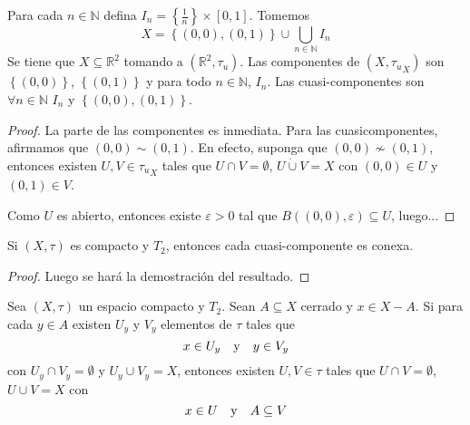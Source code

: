 \documentclass[12pt]{report}
\theoremstyle{largebreak}
\begin{document}
    \begin{exa}
        Para cada $n\in\mathbb{N}$ defina $I_n=\left\{\frac{1}{n}\right\}\times[0,1]$. Tomemos
        \begin{equation*}
            X=\left\{(0,0),(0,1) \right\}\cup\bigcup_{ n\in\mathbb{N}}I_n
        \end{equation*}
        Se tiene que $X\subseteq\mathbb{R}^2$ tomando a $(\mathbb{R}^2,\tau_u)$. Las componentes de $(X,{\tau_u}_X)$ son $\left\{(0,0)\right\}$, $\left\{(0,1)\right\}$ y para todo $n\in\mathbb{N}$, $I_n$. Las cuasi-componentes son $\forall n\in\mathbb{N}$ $I_n$ y $\left\{(0,0),(0,1) \right\}$.
    \end{exa}

    \begin{proof}
        La parte de las componentes es inmediata. Para las cuasicomponentes, afirmamos que $(0,0)\sim(0,1)$. En efecto, suponga que $(0,0)\nsim (0,1)$, entonces existen $U,V\in{\tau_u}_X$ tales que $U\cap V=\emptyset$, $U\dot{\cup}V=X$ con $(0,0)\in U$ y $(0,1)\in V$.

        Como $U$ es abierto, entonces existe $\varepsilon>0$ tal que $B((0,0),\varepsilon)\subseteq U$, luego...
    \end{proof}

    \begin{theor}
        Si $(X,\tau)$ es compacto y $T_2$, entonces cada cuasi-componente es conexa.
    \end{theor}

    \begin{proof}
        Luego se hará la demostración del resultado.
    \end{proof}

    \begin{lema}
        Sea $(X,\tau)$ un espacio compacto y $T_2$. Sean $A\subseteq X$ cerrado y $x\in X-A$. Si para cada $y\in A$ existen $U_y$ y $V_y$ elementos de $\tau$ tales que
        \begin{equation*}
            x\in U_y\quad\textup{y}\quad y\in V_y
        \end{equation*}
        con $U_y\cap V_y=\emptyset$ y $U_y\cup V_y=X$, entonces existen $U,V\in\tau$ tales que $U\cap V=\emptyset$, $U\cup V=X$ con
        \begin{equation*}
            x\in U\quad\textup{y}\quad A\subseteq V
        \end{equation*}
    \end{lema}
\end{document}
